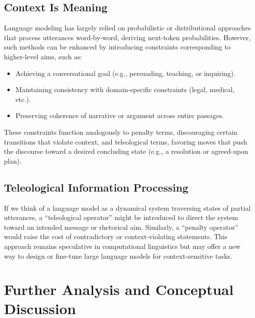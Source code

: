 \documentclass[11pt]{article}
\begin{document}
\subsection{Context Is Meaning}
Language modeling has largely relied on probabilistic or distributional approaches that process utterances word-by-word, deriving next-token probabilities. However, such methods can be enhanced by introducing constraints corresponding to higher-level aims, such as:
\begin{itemize}
    \item Achieving a conversational goal (e.g., persuading, teaching, or inquiring).
    \item Maintaining consistency with domain-specific constraints (legal, medical, etc.).
    \item Preserving coherence of narrative or argument across entire passages.
\end{itemize}
These constraints function analogously to penalty terms, discouraging certain transitions that violate context, and teleological terms, favoring moves that push the discourse toward a desired concluding state (e.g., a resolution or agreed-upon plan).

\subsection{Teleological Information Processing}
If we think of a language model as a dynamical system traversing states of partial utterances, a ``teleological operator'' might be introduced to direct the system toward an intended message or rhetorical aim. Similarly, a ``penalty operator'' would raise the cost of contradictory or context-violating statements. This approach remains speculative in computational linguistics but may offer a new way to design or fine-tune large language models for context-sensitive tasks.

\section{Further Analysis and Conceptual Discussion}
\label{sec:discussion}
\end{document}
